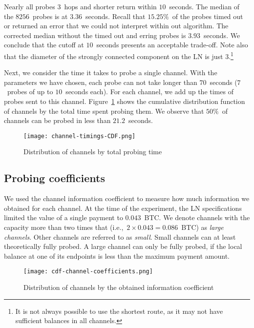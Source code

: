 Nearly all probes $3$~hops and shorter return within $10$~seconds.
The median of the $8256$~probes is at $3.36$~seconds.
Recall that $15.25\%$~of the probes timed out or returned an error that we could not interpret within out algorithm.
The corrected median without the timed out and erring probes is $3.93$~seconds. 
We conclude that the cutoff at $10$~seconds presents an acceptable trade-off.
Note also that the diameter of the strongly connected component on the LN is just $3$.\footnote{It is not always possible to use the shortest route, as it may not have sufficient balances in all channels.}

Next, we consider the time it takes to probe a single channel.
With the parameters we have chosen, each probe can not take longer than $70$~seconds ($7$~probes of up to $10$~seconds each).
For each channel, we add up the times of probes sent to this channel.
Figure~\ref{fig:channel-timings-CDF} shows the cumulative distribution function of channels by the total time spent probing them.
We observe that $50\%$~of channels can be probed in less than $21.2$~seconds.

\begin{figure}[ht]
	\centering
	\texttt{[image: channel-timings-CDF.png]}
	\caption{Distribution of channels by total probing time}
	\label{fig:channel-timings-CDF}
\end{figure}


\subsection{Probing coefficients}

We used the channel information coefficient to measure how much information we obtained for each channel.
At the time of the experiment, the LN specifications limited the value of a single payment to $0.043$~BTC.
We denote channels with the capacity more than two times that (i.e.,~$2 \times 0.043 = 0.086$~BTC) as \textit{large channels}.
Other channels are referred to as \textit{small}.
Small channels can at least theoretically fully probed.
A large channel can only be fully probed, if the local balance at one of its endpoints is less than the maximum payment amount.

\begin{figure}[ht]
	\centering
	\texttt{[image: cdf-channel-coefficients.png]}
	\caption{Distribution of channels by the obtained information coefficient}
	\label{fig:cdf-channel-coefficients}
\end{figure}

